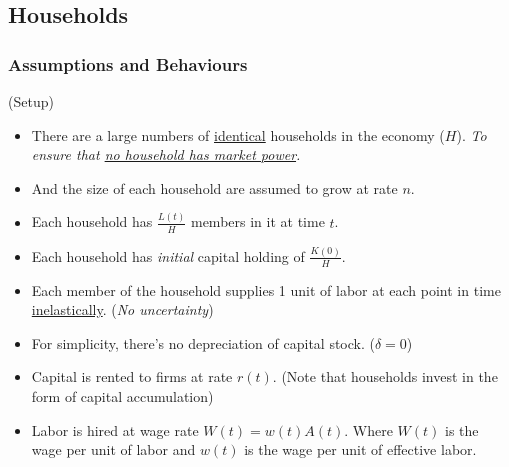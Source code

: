 \documentclass[11pt]{article}
\begin{document}
	\subsection{Households}
	\subsubsection{Assumptions and Behaviours}
	\begin{assumption}(Setup)
		\begin{itemize}
			\item There are a large numbers of \ul{identical} households in the economy ($H$). \emph{To ensure that \ul{no household has market power}.}
			\item And the size of each household are assumed to grow at rate $n$.
			\item Each household has $\frac{L(t)}{H}$ members in it at time $t$.
			\item Each household has \emph{initial} capital holding of $\frac{K(0)}{H}$.
			\item Each member of the household supplies 1 unit of labor at each point in time \ul{inelastically}. (\emph{No uncertainty})
			\item For simplicity, there's no depreciation of capital stock. ($\delta = 0$)
			\item Capital is rented to firms at rate $r(t)$. (Note that households invest in the form of capital accumulation)
			\item Labor is hired at wage rate $W(t) = w(t)A(t)$. Where $W(t)$ is the wage per unit of labor and $w(t)$ is the wage per unit of effective labor.
		\end{itemize}
	\end{assumption}
	
\end{document}
